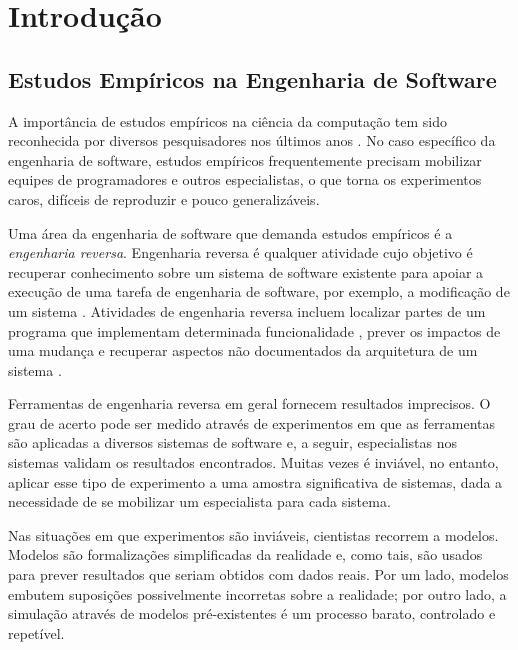 %

\chapter{Introdução}

\section{Estudos Empíricos na Engenharia de Software}

A importância de estudos empíricos na ciência da computação tem sido reconhecida por diversos pesquisadores nos últimos anos \cite{Basili1996,Tichy1998,Feitelson2005}. No caso específico da engenharia de software, estudos empíricos frequentemente precisam mobilizar equipes de programadores e outros especialistas, o que torna os experimentos caros, difíceis de reproduzir e pouco generalizáveis.

Uma área da engenharia de software que demanda estudos empíricos é a \emph{engenharia reversa}. Engenharia reversa é qualquer atividade cujo objetivo é recuperar conhecimento sobre um sistema de software existente para apoiar a execução de uma tarefa de engenharia de software, por exemplo, a modificação de um sistema \cite{Tonella2007}. Atividades de engenharia reversa incluem localizar partes de um programa que implementam determinada funcionalidade \cite{Zhao2004}, prever os impactos de uma mudança \cite{Arnold1993} e recuperar aspectos não documentados da arquitetura de um sistema \cite{Pollet2007}.

Ferramentas de engenharia reversa em geral fornecem resultados imprecisos. O grau de acerto pode ser medido através de experimentos em que as ferramentas são aplicadas a diversos sistemas de software e, a seguir, especialistas nos sistemas validam os resultados encontrados. Muitas vezes é inviável, no entanto, aplicar esse tipo de experimento a uma amostra significativa de sistemas, dada a necessidade de se mobilizar um especialista para cada sistema.

Nas situações em que experimentos são inviáveis, cientistas recorrem a modelos. Modelos são formalizações simplificadas da realidade e, como tais, são usados para prever resultados que seriam obtidos com dados reais. Por um lado, modelos embutem suposições possivelmente incorretas sobre a realidade; por outro lado, a simulação através de modelos pré-existentes é um processo barato, controlado e repetível.

